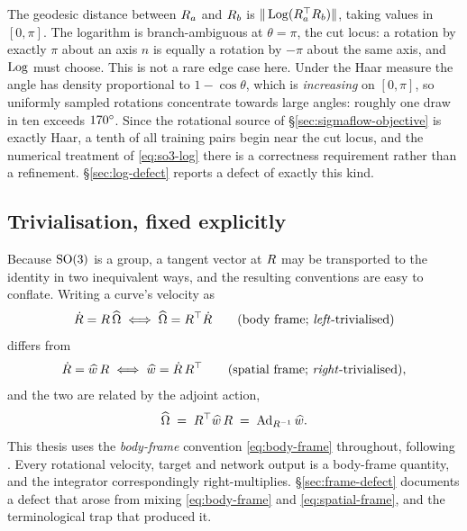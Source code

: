 The geodesic distance between $R_a$ and $R_b$ is
$\|\operatorname{Log}(R_a^\top R_b)\|$, taking values in $[0,\pi]$. The logarithm is
branch-ambiguous at $\theta = \pi$, the cut locus: a rotation by exactly $\pi$
about an axis $n$ is equally a rotation by $-\pi$ about the same axis, and
$\operatorname{Log}$ must choose. This is not a rare edge case here. Under the Haar measure
the angle has density proportional to $1 - \cos\theta$, which is
\emph{increasing} on $[0,\pi]$, so uniformly sampled rotations concentrate
towards large angles: roughly one draw in ten exceeds $170^{\circ}$. Since the
rotational source of \S\ref{sec:sigmaflow-objective} is exactly Haar, a tenth
of all training pairs begin near the cut locus, and the numerical treatment of
\eqref{eq:so3-log} there is a correctness requirement rather than a
refinement. \S\ref{sec:log-defect} reports a defect of exactly this kind.

\subsection{Trivialisation, fixed explicitly}
\label{sec:trivialisation}

Because $\mathrm{SO}(3)$ is a group, a tangent vector at $R$ may be transported
to the identity in two inequivalent ways, and the resulting conventions are
easy to conflate. Writing a curve's velocity as
\begin{equation}
  \dot{R} = R\,\widehat{\Omega}
  \;\Longleftrightarrow\;
  \widehat{\Omega} = R^\top \dot{R}
  \qquad\text{(body frame; \emph{left}-trivialised)}
  \label{eq:body-frame}
\end{equation}
differs from
\begin{equation}
  \dot{R} = \widehat{w}\,R
  \;\Longleftrightarrow\;
  \widehat{w} = \dot{R}\,R^\top
  \qquad\text{(spatial frame; \emph{right}-trivialised)},
  \label{eq:spatial-frame}
\end{equation}
and the two are related by the adjoint action,
\begin{equation}
  \widehat{\Omega} \;=\; R^\top \widehat{w}\, R
  \;=\; \operatorname{Ad}_{R^{-1}} \widehat{w} .
  \label{eq:adjoint}
\end{equation}
This thesis uses the \emph{body-frame} convention \eqref{eq:body-frame}
throughout, following \citet{marsden1999introduction}. Every rotational
velocity, target and network output is a body-frame quantity, and the
integrator correspondingly right-multiplies. \S\ref{sec:frame-defect}
documents a defect that arose from mixing \eqref{eq:body-frame} and
\eqref{eq:spatial-frame}, and the terminological trap that produced it.

